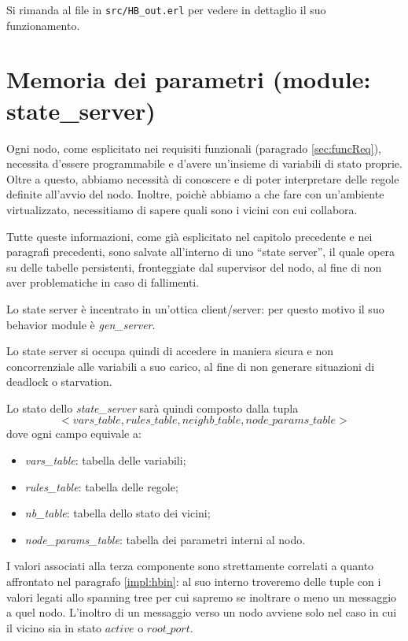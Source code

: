 \documentclass[italian]{memoir}
\begin{document}
Si rimanda al file in \texttt{src/HB\_out.erl} per vedere in dettaglio il suo funzionamento.

\section{Memoria dei parametri (module: state\_server)}
Ogni nodo, come esplicitato nei requisiti funzionali (paragrado \ref{sec:funcReq}), necessita d'essere programmabile e d'avere un'insieme di variabili di stato proprie. Oltre a questo, abbiamo necessità di conoscere e di poter interpretare delle regole definite all'avvio del nodo. Inoltre, poichè abbiamo a che fare con un'ambiente virtualizzato, necessitiamo di sapere quali sono i vicini con cui collabora.

Tutte queste informazioni, come già esplicitato nel capitolo precedente e nei paragrafi precedenti, sono salvate all'interno di uno ``state server'', il quale opera su delle tabelle persistenti, fronteggiate dal supervisor del nodo, al fine di non aver problematiche in caso di fallimenti.

Lo state server è incentrato in un'ottica client/server: per questo motivo il suo behavior module è \textit{gen\_server}.

Lo state server si occupa quindi di accedere in maniera sicura e non concorrenziale alle variabili a suo carico, al fine di non generare situazioni di deadlock o starvation.

Lo stato dello \textit{state\_server} sarà quindi composto dalla tupla
$$
    <vars\_table, rules\_table, neighb\_table, node\_params\_table>
$$
dove ogni campo equivale a:
\begin{itemize}
    \item \textit{vars\_table}: tabella delle variabili;
    \item \textit{rules\_table}: tabella delle regole;
    \item \textit{nb\_table}: tabella dello stato dei vicini;
    \item \textit{node\_params\_table}: tabella dei parametri interni al nodo.
\end{itemize}

I valori associati alla terza componente sono strettamente correlati a quanto affrontato nel paragrafo \ref{impl:hbin}: al suo interno troveremo delle tuple con i valori legati allo spanning tree per cui sapremo se inoltrare o meno un messaggio a quel nodo. L'inoltro di un messaggio verso un nodo avviene solo nel caso in cui il vicino sia in stato $active$ o $root\_port$.
\end{document}
